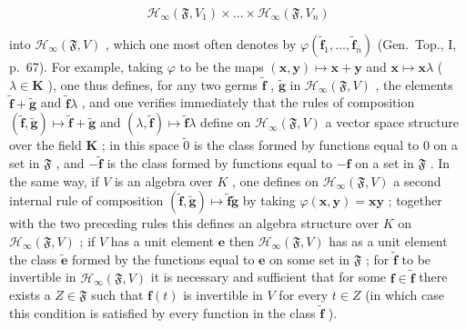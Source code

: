 \[
\mathcal {H} _ {\infty} (\mathfrak {F}, V _ {1}) \times \dots \times \mathcal {H} _ {\infty} (\mathfrak {F}, V _ {n})
\]

into \(\mathcal{H}_{\infty}(\mathfrak{F}, V)\) , which one most often denotes by \(\varphi(\tilde{\mathbf{f}}_1, \ldots, \tilde{\mathbf{f}}_n)\) (Gen.~Top., I, p.~67). For example, taking \(\varphi\) to be the maps \((\mathbf{x}, \mathbf{y}) \mapsto \mathbf{x} + \mathbf{y}\) and \(\mathbf{x} \mapsto \mathbf{x}\lambda\) ( \(\lambda \in \mathbf{K}\) ), one thus defines, for any two germs \(\tilde{\mathbf{f}}\) , \(\tilde{\mathbf{g}}\) in \(\mathcal{H}_{\infty}(\mathfrak{F}, V)\) , the elements \(\tilde{\mathbf{f}} + \tilde{\mathbf{g}}\) and \(\tilde{\mathbf{f}}\lambda\) , and one verifies immediately that the rules of composition \((\tilde{\mathbf{f}}, \tilde{\mathbf{g}}) \mapsto \tilde{\mathbf{f}} + \tilde{\mathbf{g}}\) and \((\lambda, \tilde{\mathbf{f}}) \mapsto \tilde{\mathbf{f}}\lambda\) define on \(\mathcal{H}_{\infty}(\mathfrak{F}, V)\) a vector space structure over the field \(\mathbf{K}\) ; in this space \(\tilde{0}\) is the class formed by functions equal to \(0\) on a set in \(\mathfrak{F}\) , and \(-\tilde{\mathbf{f}}\) is the class formed by functions equal to \(-\mathbf{f}\) on a set in \(\mathfrak{F}\) . In the same way, if \(V\) is an algebra over \(K\) , one defines on \(\mathcal{H}_{\infty}(\mathfrak{F}, V)\) a second internal rule of composition \((\tilde{\mathbf{f}}, \tilde{\mathbf{g}}) \mapsto \tilde{\mathbf{f}}\tilde{\mathbf{g}}\) by taking \(\varphi(\mathbf{x}, \mathbf{y}) = \mathbf{x}\mathbf{y}\) ; together with the two preceding rules this defines an algebra structure over \(K\) on \(\mathcal{H}_{\infty}(\mathfrak{F}, V)\) ; if \(V\) has a unit element \(\mathbf{e}\) then \(\mathcal{H}_{\infty}(\mathfrak{F}, V)\) has as a unit element the class \(\tilde{\mathbf{e}}\) formed by the functions equal to \(\mathbf{e}\) on some set in \(\mathfrak{F}\) ; for \(\tilde{\mathbf{f}}\) to be invertible in \(\mathcal{H}_{\infty}(\mathfrak{F}, V)\) it is necessary and sufficient that for some \(\mathbf{f} \in \tilde{\mathbf{f}}\) there exists a \(Z \in \mathfrak{F}\) such that \(\mathbf{f}(t)\) is invertible in \(V\) for every \(t \in Z\) (in which case this condition is satisfied by every function in the class \(\tilde{\mathbf{f}}\) ).

